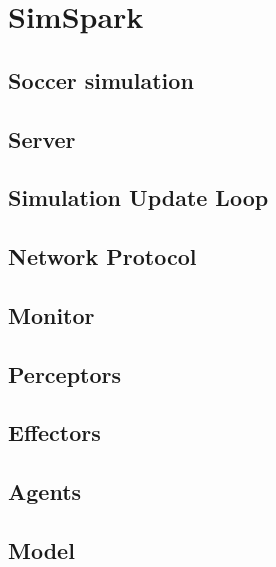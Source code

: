 \chapter{SimSpark}
\label{communication}

\section{Soccer simulation}

\section{Server}

\section{Simulation Update Loop}

\section{Network Protocol}

\section{Monitor}

\section{Perceptors}

\section{Effectors}

\section{Agents}

\section{Model}



